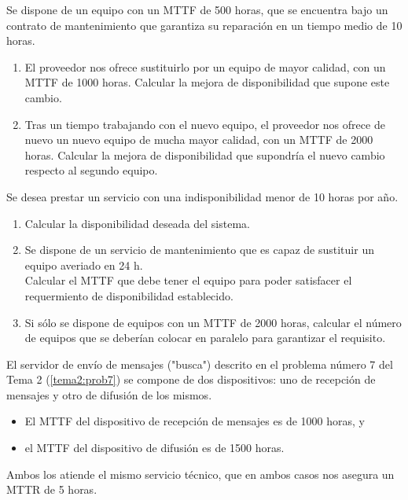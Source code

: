 \Problem[1]
Se dispone de un equipo con un MTTF de 500 horas, que se encuentra bajo un
contrato de mantenimiento que garantiza su reparación en un tiempo medio de
10 horas.
\begin{enumerate}
  \item El proveedor nos ofrece sustituirlo por un equipo de mayor calidad, con un MTTF de 1000 horas. Calcular la mejora de disponibilidad que supone este cambio.
  \item Tras un tiempo trabajando con el nuevo equipo, el proveedor nos ofrece de nuevo un nuevo equipo de mucha mayor calidad, con un MTTF de 2000 horas. Calcular la mejora de disponibilidad que supondría el nuevo cambio respecto al segundo equipo.
\end{enumerate}

\TheSolution



\Problem[2]
Se desea prestar un servicio con una indisponibilidad menor de 10 horas por
año.
  \begin{enumerate}
    	\item Calcular la disponibilidad deseada del sistema.
    	\item Se dispone de un servicio de mantenimiento que es capaz de sustituir un equipo averiado en 24 h.\\
Calcular el MTTF que debe tener el equipo para poder satisfacer el requermiento de disponibilidad establecido.
    	\item Si sólo se dispone de equipos con un MTTF de 2000 horas, calcular el número de equipos que se deberían colocar en paralelo para garantizar el requisito.
  \end{enumerate}

\TheSolution



\Problem[3]
El servidor de envío de mensajes ("busca") descrito en el problema número 7 del Tema 2 (\ref{tema2:prob7}) se compone de dos dispositivos: uno de recepción de mensajes y otro de difusión de los mismos.
\begin{itemize}
\item El MTTF del dispositivo de recepción de mensajes es de 1000 horas, y
\item el MTTF del dispositivo de difusión es de 1500 horas.
\end{itemize}
Ambos los atiende el mismo servicio técnico, que en ambos casos nos asegura un MTTR de 5 horas.\\

